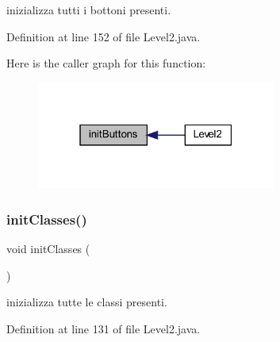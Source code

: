 inizializza tutti i bottoni presenti. 



Definition at line 152 of file Level2.\+java.

Here is the caller graph for this function\+:\nopagebreak
\begin{figure}[H]
\begin{center}
\leavevmode
\includegraphics[width=223pt]{classscenes_1_1_level2_a27d3ba5afb772cc36c9a432c28975ace_icgraph}
\end{center}
\end{figure}
\mbox{\label{classscenes_1_1_level2_afe125d345675ffefe8da7e96d39773f3}} 
\subsubsection{\texorpdfstring{init\+Classes()}{initClasses()}}
{\footnotesize\ttfamily void init\+Classes (\begin{DoxyParamCaption}{ }\end{DoxyParamCaption})}



inizializza tutte le classi presenti. 



Definition at line 131 of file Level2.\+java.

